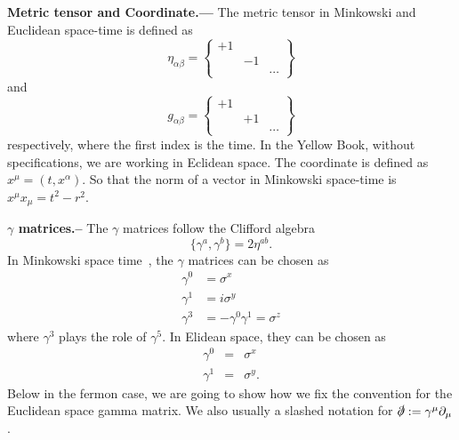 \documentclass[submission, PhysLectNotes]{SciPost}
\begin{document}
{\bf Metric tensor and Coordinate.---}  The metric tensor in Minkowski and Euclidean space-time is defined as
\begin{equation}
    \eta_{\alpha\beta} = \begin{Bmatrix}
        +1 &   &\\
           & -1& \\
           &   & \cdots
    \end{Bmatrix}
\end{equation}
and
\begin{equation}
    g_{\alpha\beta} = \begin{Bmatrix}
        +1 &   &\\
           & +1& \\
           &   & \cdots
    \end{Bmatrix}
\end{equation}
respectively, where the first index is the time. In the Yellow Book, without specifications, we are working in Eclidean space. The coordinate is defined as $x^\mu = (t, x^{\alpha})$. So that the norm of a vector in Minkowski space-time is $x^\mu x_\mu = t^2 - r^2$.

{\bf $\gamma$ matrices.--}   
The $\gamma$ matrices follow the Clifford algebra
\begin{equation}
    \{\gamma^a,\gamma^b\} = 2\eta^{ab}.
\end{equation}
In Minkowski space time , the $\gamma$ matrices can be chosen as
\begin{equation}
	\begin{aligned}
    	\gamma^0 &= \sigma^x \nonumber \\
    	\gamma^1 &=  i\sigma^y \\
		\gamma^3 &= -\gamma^0\gamma^1 = \sigma^z
	\end{aligned}
\end{equation}
where $\gamma^3$ plays the role of $\gamma^5$. In Elidean space, they can be chosen as
\begin{eqnarray}
    \gamma^0 &=& \sigma^x \nonumber \\
    \gamma^1 &=& \sigma^y.
\end{eqnarray}
Below in the fermon case, we are going to show how we fix the convention for the Euclidean space gamma matrix. We also usually a slashed notation for $\slashed{\partial} := \gamma^\mu \partial_\mu$.\\
\end{document}
